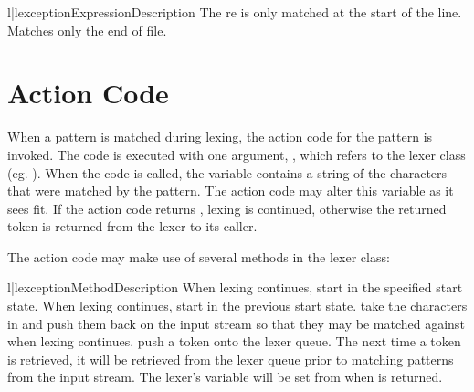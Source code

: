 \begin{tableii}{l|l}{exception}{Expression}{Description}
      {The re is only matched at the start of the line.}
    {Matches only the end of file.}
\end{tableii}


\section{Action Code}
When a pattern is matched during lexing, the action code for the pattern
is invoked.  The code is executed with one argument, , which refers
to the lexer class (eg. ).  When the code is called,
the  variable contains a string of the characters that
were matched by the pattern.  The action code may alter this variable
as it sees fit.
If the action code returns , lexing is continued, otherwise the
returned token is returned from the lexer to its caller.

The action code may make use of several methods in the lexer class:

\begin{tableii}{l|l}{exception}{Method}{Description}
	{When lexing continues, start in the specified start state.}
	{When lexing continues, start in the previous start state.}
	{take the characters in  and
       push them back on the input stream so that they may be
       matched against when lexing continues.}
	{push a token onto the lexer queue.
       The next time a token is retrieved, it will be retrieved from
       the lexer queue prior to matching patterns from the input
       stream.  The lexer's  variable will be set from
        when  is returned.}
\end{tableii}

